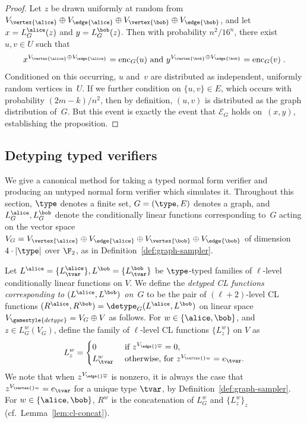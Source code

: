 \begin{proof}
  Let $z$ be drawn uniformly at random from $V_{\vertex{\alice}}\oplus
  V_{\edge{\alice}}\oplus V_{\vertex{\bob}} \oplus V_{\edge{\bob}}$, and let $x
  = L^\alice_G(z)$ and $y = L^\bob_G(z)$.
  Then with probability $n^2/16^n$, there exist $u, v \in U$ such that
  \begin{equation*}
    \text{$x^{V_{\vertex{\alice}} \oplus V_{\edge{\alice}}} = \mathrm{enc}_G(u)$
      and $y^{V_{\vertex{\bob}} \oplus V_{\edge{\bob}}} = \mathrm{enc}_G(v)$}\;.
  \end{equation*}
  Conditioned on this occurring, $u$ and~$v$ are distributed as independent,
  uniformly random vertices in~$U$.
  If we further condition on $\{u, v\} \in E$, which occurs with probability
  $(2m-k)/n^2$, then by definition, $(u, v)$ is distributed as the graph
  distribution of~$G$.
  But this event is exactly the event that $\mathcal{E}_G$ holds on~$(x, y)$,
  establishing the proposition.
\end{proof}

\subsection{Detyping typed verifiers}
\label{sec:detype}  

We give a canonical method for taking a typed normal form verifier and producing
an untyped normal form verifier which simulates it.
Throughout this section, $\type$ denotes a finite set, $G = (\type, E)$ denotes
a graph, and $L_G^\alice, L_G^\bob$ denote the conditionally linear functions
corresponding to~$G$ acting on the vector space $V_G = V_{\vertex{\alice}}
\oplus V_{\edge{\alice}} \oplus V_{\vertex{\bob}} \oplus V_{\edge{\bob}}$ of
dimension $4\cdot |\type|$ over $\F_2$, as in
Definition~\ref{def:graph-sampler}.

\begin{definition}
  \label{def:detyped-CL}
  Let $L^\alice = \{L^{\alice}_{\tvar}\}, L^\bob = \{L^{\bob}_{\tvar}\}$ be
  $\type$-typed families of $\ell$-level conditionally linear functions on $V$.
  We define the \emph{detyped CL functions corresponding to $(L^\alice, L^\bob)$
    on~$G$} to be the pair of $(\ell+2)$-level CL functions $(R^\alice, R^\bob)
  = \detype_G(L^\alice, L^\bob)$ on linear space $V_{\gamestyle{detype}} = V_G
  \oplus V$ as follows.
  For $w \in \{\alice, \bob\}$, and $z \in L^w_G (V_G)$, define the family of
  $\ell$-level CL functions $\{L^w_z\}$ on $V$ as
  \begin{equation*}
    L^w_z =
    \begin{cases}
      0 & \text{ if } z^{V_{\edge{}\overline{w}}} = 0,\\
      L^w_\tvar & \text { otherwise, for } z^{V_{\vertex{}w}} = e_\tvar.
    \end{cases}
  \end{equation*}
  We note that when $z^{V_{\edge{}\overline{w}}}$ is nonzero, it is always the
  case that $z^{V_{\vertex{}w}} = e_\tvar$ for a unique type $\tvar$, by
  Definition~\ref{def:graph-sampler}.
  For $w\in \{\alice, \bob\}$, $R^w$ is the concatenation of $L^w_G$ and
  $\{L^w_z\}_z$ (cf.\ Lemma~\ref{lem:cl-concat}).
\end{definition}

